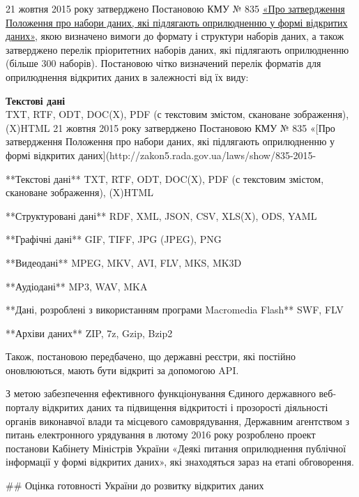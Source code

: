 21 жовтня 2015 року затверджено Постановою КМУ № 835 \href{http://zakon5.rada.gov.ua/laws/show/835-2015-%D0%BF}{«Про затвердження Положення про набори даних, які підлягають оприлюдненню у формі відкритих даних»}, якою визначено вимоги до формату і структури наборів даних, а також затверджено перелік пріоритетних наборів даних, які підлягають оприлюдненню (більше 300 наборів). Постановою чітко визначений перелік форматів для оприлюднення відкритих даних в залежності від їх виду:

\textbf{Текстові дані} \\
TXT, RTF, ODT, DOC(X), PDF (с текстовим змістом, скановане зображення), (X)HTML
21 жовтня 2015 року затверджено Постановою КМУ № 835 «[Про затвердження Положення про набори даних, які підлягають оприлюдненню у формі відкритих даних](http://zakon5.rada.gov.ua/laws/show/835-2015-%

**Текстові дані**  
TXT, RTF, ODT, DOC(X), PDF (с текстовим змістом, скановане зображення), (X)HTML

**Структуровані дані**  
RDF, XML, JSON, CSV, XLS(X), ODS, YAML

**Графічні дані**  
GIF, TIFF, JPG (JPEG), PNG

**Видеодані**  
MPEG, MKV, AVI, FLV, MKS, MK3D

**Аудіодані**  
MP3, WAV, MKA

**Дані, розроблені з використанням програми Macromedia Flash**  
SWF, FLV

**Архіви даних**  
ZIP, 7z, Gzip, Bzip2

Також, постановою передбачено, що державні реєстри, які постійно оновлюються, мають бути відкриті за допомогою API.

З метою забезпечення ефективного функціонування Єдиного державного веб-порталу відкритих даних та підвищення відкритості і прозорості діяльності органів виконавчої влади та місцевого самоврядування, Державним агентством з питань електронного урядування в лютому 2016 року розроблено проект постанови Кабінету Міністрів України «Деякі питання оприлюднення публічної інформації у формі відкритих даних», які знаходяться зараз на етапі обговорення. 

## Оцінка готовності України до розвитку відкритих даних

